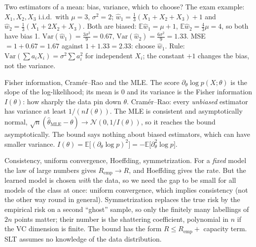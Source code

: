 \begin{qabox}[Holzleitner]{\cexam Two estimators of a mean: bias, variance, which to choose?}
\ans The exam example: $X_1,X_2,X_3$ i.i.d.\ with $\mu=3$, $\sigma^2=2$;
$\hat w_1=\frac13(X_1+X_2+X_3)+1$ and $\hat w_2=\frac13(X_1+2X_2+X_3)$. Both are biased:
$\mathbb{E}\hat w_1=\mu+1$, $\mathbb{E}\hat w_2=\frac43\mu=4$, so both have bias 1.
$\mathrm{Var}(\hat w_1)=\frac{3\sigma^2}{9}=0.67$, $\mathrm{Var}(\hat w_2)=\frac{6\sigma^2}{9}=1.33$.
MSE $=1+0.67=1.67$ against $1+1.33=2.33$: choose $\hat w_1$.
\follow Rule: $\mathrm{Var}(\sum a_iX_i)=\sigma^2\sum a_i^2$ for independent $X_i$; the constant $+1$
changes the bias, not the variance.
\end{qabox}

\begin{qabox}[Holzleitner]{\cexam Fisher information, Cram\'er--Rao and the MLE.}
\ans The score $\partial_\theta\log p(X;\theta)$ is the slope of the log-likelihood; its mean is 0
and its variance is the Fisher information $I(\theta)$: how sharply the data pin down $\theta$.
Cram\'er--Rao: every \emph{unbiased} estimator has variance at least $1/(nI(\theta))$. The MLE is
consistent and asymptotically normal, $\sqrt n(\hat\theta_{\mathrm{MLE}}-\theta)\to\mathcal{N}(0,1/I(\theta))$,
so it reaches the bound asymptotically. The bound says nothing about biased estimators, which can have
smaller variance.
\formula $I(\theta)=\mathbb{E}\bigl[(\partial_\theta\log p)^2\bigr]=-\mathbb{E}\bigl[\partial_\theta^2\log p\bigr]$.
\end{qabox}

\begin{qabox}[Holzleitner]{\cexam Consistency, uniform convergence, Hoeffding, symmetrization.}
\ans For a \emph{fixed} model the law of large numbers gives $R_{\mathrm{emp}}\to R$, and Hoeffding
gives the rate. But the learned model is chosen \emph{with} the data, so we need the gap to be small
for all models of the class at once: uniform convergence, which implies consistency (not the other
way round in general). Symmetrization replaces the true risk by the empirical risk on a second
``ghost'' sample, so only the finitely many labellings of $2n$ points matter; their number is the
shattering coefficient, polynomial in $n$ if the VC dimension is finite. The bound has the form
$R\le R_{\mathrm{emp}}+$ capacity term. SLT assumes no knowledge of the data distribution.
\end{qabox}

